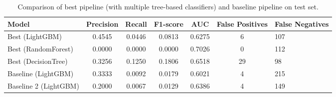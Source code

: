 
\begin{table}[ht]
\centering
\begin{tabular}{lccccc}
\hline
Model & Precision & Recall & F1-score & AUC & False Positives & False Negatives \\
\hline
Best (LightGBM) & 0.4545 & 0.0446 & 0.0813 & 0.6275 & 6 & 107 \\
Best (RandomForest) & 0.0000 & 0.0000 & 0.0000 & 0.7026 & 0 & 112 \\
Best (DecisionTree) & 0.3256 & 0.1250 & 0.1806 & 0.6518 & 29 & 98 \\
Baseline (LightGBM) & 0.3333 & 0.0092 & 0.0179 & 0.6021 & 4 & 215 \\
Baseline 2 (LightGBM) & 0.2000 & 0.0067 & 0.0129 & 0.6386 & 4 & 149 \\
\hline
\end{tabular}
\caption{Comparison of best pipeline (with multiple tree-based classifiers) and baseline pipeline on test set.}
\label{tab:best_baseline_comparison}
\end{table}
